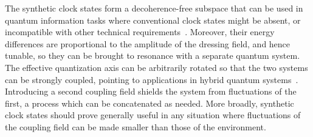 The synthetic clock states form a decoherence-free subspace that can be used in quantum information tasks where conventional clock states might be absent, or incompatible with other technical requirements~\cite{bacon_universal_2000}.
Moreover, their energy differences are proportional to the amplitude of the dressing field, and hence tunable, so they can be brought to resonance with a separate quantum system.
The effective quantization axis can be arbitrarily rotated so that the two systems can be strongly coupled, pointing to applications in hybrid quantum systems~\cite{solano_chapter_2017,xiang_hybrid_2013}.
Introducing a second coupling field shields the system from fluctuations of the first, a process which can be concatenated as needed.
More broadly, synthetic clock states should prove generally useful in any situation where fluctuations of the coupling field can be made smaller than those of the environment.













